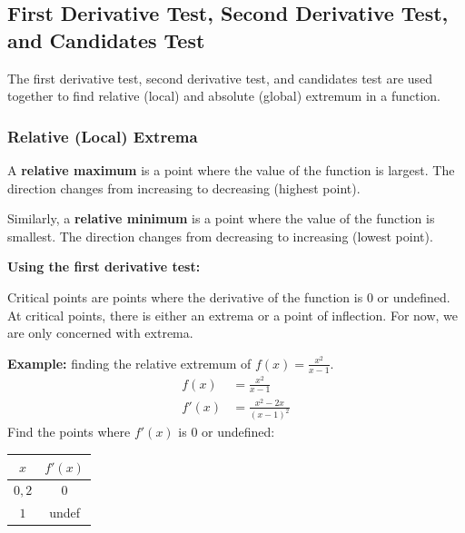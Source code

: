 \documentclass[12pt]{article}
\begin{document}
\subsection[First Derivative Test, Second Derivative Test, and Candidates Test]{First Derivative Test, Second Derivative Test, \\and Candidates Test}
The first derivative test, second derivative test, and candidates test are used together to find relative (local) and absolute (global) extremum in a function.

\subsubsection{Relative (Local) Extrema}
A \textbf{relative maximum} is a point where the value of the function is largest. The direction changes from increasing to decreasing (highest point).

Similarly, a \textbf{relative minimum} is a point where the value of the function is smallest. The direction changes from decreasing to increasing (lowest point).

\noindent \textbf{Using the first derivative test:}

Critical points are points where the derivative of the function is $0$ or undefined. At critical points, there is either an extrema or a point of inflection. For now, we are only concerned with extrema.

\noindent \textbf{Example:} finding the relative extremum of $f(x) = \frac{x^2}{x-1}$.
\begin{align*}
    f(x)  & = \frac{x^2}{x-1}        \\[6pt]
    f'(x) & = \frac{x^2-2x}{(x-1)^2}
\end{align*}
Find the points where $f'(x)$ is $0$ or undefined:
\begin{center}
    \begin{tabular}{|c|c|}
        \hline
        $x$    & $f'(x)$ \\
        \hline \hline
        $0, 2$ & $0$     \\
        \hline
        $1$    & undef   \\
        \hline
    \end{tabular}
\end{center}
\end{document}
